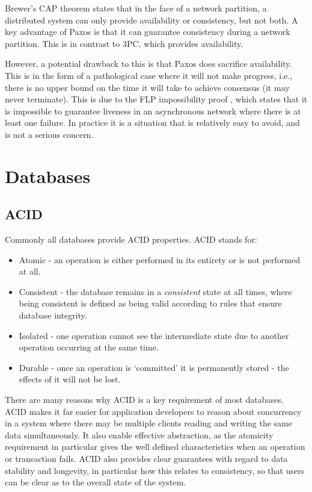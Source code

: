 \documentclass[12pt,twoside,notitlepage]{report}
\begin{document}
Brewer's CAP theorem\cite{brewer2000}\cite{gilbert2002} states that in the face of a
network partition, a distributed system can only provide availability or consistency, but not
both. A key advantage of Paxos is that it can guarantee consistency during a network partition.
This is in contrast to 3PC, which provides availability.

However, a potential drawback to this is that Paxos does sacrifice availability. This is in the
form of a pathological case where it will not make progress, i.e., there is no upper bound on the
time it will take to achieve consensus (it may never terminate). This is due to the FLP
impossibility proof \cite{fischer85}, which states that it is impossible to guarantee liveness in
an asynchronous network where there is at least one failure.  In practice it is a situation that
is relatively easy to avoid, and is not a serious concern.

\section{Databases}

\subsection*{ACID}

Commonly all databases provide ACID properties. ACID stands for:

\begin{itemize}
\item Atomic - an operation is either performed in its entirety or is not performed at all.
\item Consistent - the database remains in a \emph{consistent} state at all times, where being
	consistent is defined as being valid according to rules that ensure database integrity.
\item Isolated - one operation cannot see the intermediate state due to another operation occurring
	at the same time.
\item Durable - once an operation is `committed' it is permanently stored - the effects of it will
	not be lost.
\end{itemize}

There are many reasons why ACID is a key requirement of most databases. ACID makes it far easier
for application developers to reason about concurrency in a system where there may be multiple
clients reading and writing the same data simultaneously. It also enable effective abstraction, as
the atomicity requirement in particular gives the well defined characteristics when an operation
or transaction fails. ACID also provides clear guarantees with regard to data stability and
longevity, in particular how this relates to consistency, so that users can be clear as to the
overall state of the system.
\end{document}
